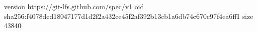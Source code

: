 version https://git-lfs.github.com/spec/v1
oid sha256:f4078ded18047177d1d2f2a432ce45f2af392b13cb1a6db74c670c97f4ea6ff1
size 43840
